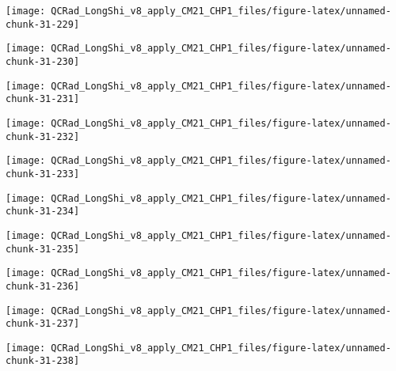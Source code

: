 \documentclass[
  10pt,
  a4paper,oneside]{article}
\begin{document}
\begin{center}\texttt{[image: QCRad\_LongShi\_v8\_apply\_CM21\_CHP1\_files/figure-latex/unnamed-chunk-31-229]} \end{center}

\begin{center}\texttt{[image: QCRad\_LongShi\_v8\_apply\_CM21\_CHP1\_files/figure-latex/unnamed-chunk-31-230]} \end{center}

\begin{center}\texttt{[image: QCRad\_LongShi\_v8\_apply\_CM21\_CHP1\_files/figure-latex/unnamed-chunk-31-231]} \end{center}

\begin{center}\texttt{[image: QCRad\_LongShi\_v8\_apply\_CM21\_CHP1\_files/figure-latex/unnamed-chunk-31-232]} \end{center}

\begin{center}\texttt{[image: QCRad\_LongShi\_v8\_apply\_CM21\_CHP1\_files/figure-latex/unnamed-chunk-31-233]} \end{center}

\begin{center}\texttt{[image: QCRad\_LongShi\_v8\_apply\_CM21\_CHP1\_files/figure-latex/unnamed-chunk-31-234]} \end{center}

\begin{center}\texttt{[image: QCRad\_LongShi\_v8\_apply\_CM21\_CHP1\_files/figure-latex/unnamed-chunk-31-235]} \end{center}

\begin{center}\texttt{[image: QCRad\_LongShi\_v8\_apply\_CM21\_CHP1\_files/figure-latex/unnamed-chunk-31-236]} \end{center}

\begin{center}\texttt{[image: QCRad\_LongShi\_v8\_apply\_CM21\_CHP1\_files/figure-latex/unnamed-chunk-31-237]} \end{center}

\begin{center}\texttt{[image: QCRad\_LongShi\_v8\_apply\_CM21\_CHP1\_files/figure-latex/unnamed-chunk-31-238]} \end{center}
\end{document}
